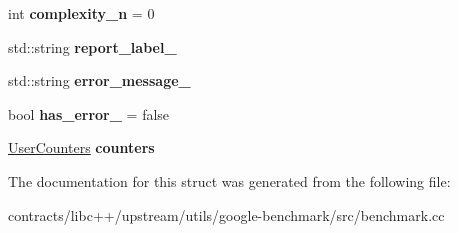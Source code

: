 \begin{DoxyCompactItemize}
int {\bfseries complexity\+\_\+n} = 0
\item 
\mbox{\label{structbenchmark_1_1internal_1_1_thread_manager_1_1_result_a1f591bc7ff83cd697e7c04fd0f3d19b6}} 
std\+::string {\bfseries report\+\_\+label\+\_\+}
\item 
\mbox{\label{structbenchmark_1_1internal_1_1_thread_manager_1_1_result_a76e82643aab4848aaa3977b22eff3627}} 
std\+::string {\bfseries error\+\_\+message\+\_\+}
\item 
\mbox{\label{structbenchmark_1_1internal_1_1_thread_manager_1_1_result_aa8e4bbe1982523385fff76aaebaf864f}} 
bool {\bfseries has\+\_\+error\+\_\+} = false
\item 
\mbox{\label{structbenchmark_1_1internal_1_1_thread_manager_1_1_result_ae3cd1a19ec4711cf756a21253db62d9b}} 
\mbox{\hyperlink{classstd_1_1map}{User\+Counters}} {\bfseries counters}
\end{DoxyCompactItemize}


The documentation for this struct was generated from the following file\+:\begin{DoxyCompactItemize}
\item 
contracts/libc++/upstream/utils/google-\/benchmark/src/benchmark.\+cc\end{DoxyCompactItemize}
